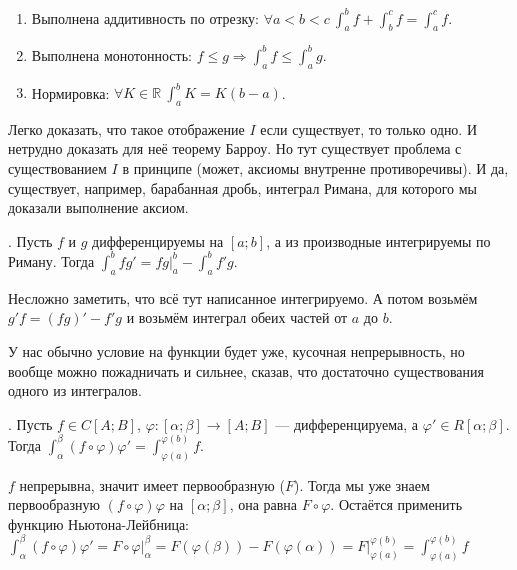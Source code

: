 \documentclass{article}
\begin{document}
\begin{itemize}
\begin{Comment}
            \begin{enumerate}
                \item Выполнена аддитивность по отрезку: $\forall a<b<c~\int_a^bf+\int_b^cf=\int_a^cf$.
                \item Выполнена монотонность: $f\leqslant g\Rightarrow\int_a^bf\leqslant\int_a^bg$.
                \item Нормировка: $\forall K\in\mathbb R~\int_a^bK=K(b-a)$.
            \end{enumerate}
            Легко доказать, что такое отображение $I$ если существует, то только одно. И нетрудно доказать для неё теорему Барроу. Но тут существует проблема с существованием $I$ в принципе (может, аксиомы внутренне противоречивы). И да, существует, например, барабанная дробь, интеграл Римана, для которого мы доказали выполнение аксиом.
        \end{Comment}
        \thm {}. Пусть $f$ и $g$ дифференцируемы на $[a;b]$, а из производные интегрируемы по Риману. Тогда $\int_a^bfg'=fg\big|_a^b-\int_a^bf'g$.
        \begin{Proof}
            Несложно заметить, что всё тут написанное интегрируемо. А потом возьмём $g'f=(fg)'-f'g$ и возьмём интеграл обеих частей от $a$ до $b$.
        \end{Proof}
        \begin{Comment}
            У нас обычно условие на функции будет уже, кусочная непрерывность, но вообще можно пожадничать и сильнее, сказав, что достаточно существования одного из интегралов.
        \end{Comment}
        \thm {}. Пусть $f\in C[A;B]$, $\varphi\colon[\alpha;\beta]\to[A;B]$ --- дифференцируема, а $\varphi'\in R[\alpha;\beta]$. Тогда $\int_\alpha^\beta(f\circ\varphi)\varphi'=\int_{\varphi(a)}^{\varphi(b)}f$.
        \begin{Proof}
            $f$ непрерывна, значит имеет первообразную ($F$). Тогда мы уже знаем первообразную $(f\circ\varphi)\varphi$ на $[\alpha;\beta]$, она равна $F\circ\varphi$. Остаётся применить функцию Ньютона-Лейбница:\\
            $
            \int_\alpha^\beta(f\circ\varphi)\varphi'=F\circ\varphi\big|_\alpha^\beta=F(\varphi(\beta))-F(\varphi(\alpha))=F\big|_{\varphi(a)}^{\varphi(b)}=\int_{\varphi(a)}^{\varphi(b)}f
            $
        \end{Proof}
        \begin{Comment}

\end{Comment}
\end{itemize}
\end{document}
